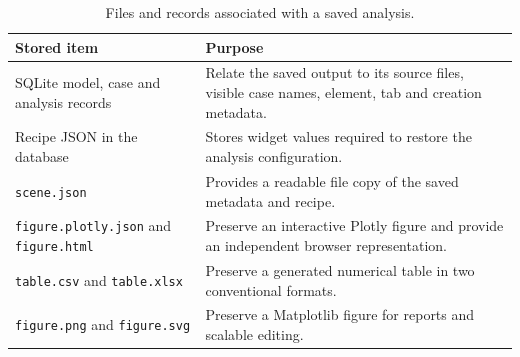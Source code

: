 \begin{table}[!htbp]
    \centering
    \caption{Files and records associated with a saved analysis.}
    \label{tab:appendix_saved_analysis_artifacts}
    \small
    \renewcommand{\arraystretch}{1.14}
    \setlength{\tabcolsep}{4pt}
    \begin{tabularx}{\textwidth}{|>{\raggedright\arraybackslash}p{}|>{\raggedright\arraybackslash}X|}
        \hline
        \textbf{Stored item} & \textbf{Purpose} \\
        \hline
        SQLite model, case and analysis records &
        Relate the saved output to its source files, visible case names,
        element, tab and creation metadata. \\
        \hline
        Recipe JSON in the database &
        Stores widget values required to restore the analysis configuration. \\
        \hline
        \texttt{scene.json} &
        Provides a readable file copy of the saved metadata and recipe. \\
        \hline
        \texttt{figure.plotly.json} and \texttt{figure.html} &
        Preserve an interactive Plotly figure and provide an independent
        browser representation. \\
        \hline
        \texttt{table.csv} and \texttt{table.xlsx} &
        Preserve a generated numerical table in two conventional formats. \\
        \hline
        \texttt{figure.png} and \texttt{figure.svg} &
        Preserve a Matplotlib figure for reports and scalable editing. \\
        \hline
    \end{tabularx}
\end{table}
